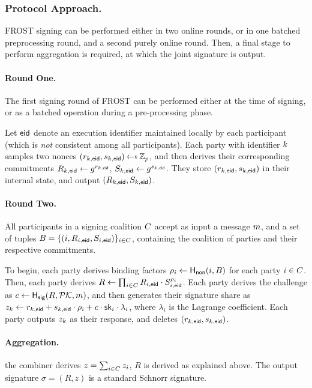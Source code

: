 \subsubsection{Protocol Approach.}

FROST signing can be performed either in two online rounds,
or in one batched preprocessing round,
and a second purely online round.
Then, a final stage to perform aggregation is required,
at which the joint signature is output.

\paragraph{Round One.}
The first signing round of FROST can be performed either at the time of signing,
or as a batched operation during a pre-processing phase.

Let $\mathsf{eid}$ denote an execution identifier maintained locally by each participant
(which is \emph{not} consistent among all participants).
Each party with identifier $k$ samples two nonces $(r_{\partyid,\eid},  s_{\partyid, \eid}) \randpick \Zp$,
and then derives their corresponding commitments  $R_{k,\mathsf{eid}} \gets g^{r_{k, \mathsf{eid}}}$, $ S_{k,\mathsf{eid}} \gets  g^{s_{k,\mathsf{eid}}}$.
They store $(r_{k,\mathsf{eid}}, s_{k,\mathsf{eid}})$ in their internal state,
and output $(R_{k,\mathsf{eid}}, S_{k,\mathsf{eid}})$.

\paragraph{Round Two.}
All participants in a signing coalition $C$ accept as input a message $m$,
and a set of tuples $B = \{ (i, R_{i,\mathsf{eid}}, S_{i,\mathsf{eid}})\}_{i \in C}$,
containing the coalition of parties and their respective commitments.

To begin,
each party derives binding factors $\rho_i \gets \mathsf{H_{non}}(i, B)$ for each party $i \in C$.
Then, each party derives $R \gets \prod_{i \in C} R_{i,\mathsf{eid}} \cdot  S_{i,\mathsf{eid}}^{\rho_i}$.
Each party derives the challenge as $c \gets \mathsf{H_{sig}}(R, \mathcal{PK}, m)$,
and then generates their signature share as
$z_k \gets r_{k,\mathsf{eid}} + s_{k,\mathsf{eid}} \cdot \rho_i + c \cdot \mathsf{sk}_i \cdot \lambda_i$,
where $\lambda_i$ is the Lagrange coefficient.
Each party outputs $z_k$ as their response,
and deletes $(r_{k,\mathsf{eid}}, s_{k,\mathsf{eid}})$.


\paragraph{Aggregation.}
the combiner derives $z = \sum_{i \in C} z_i$,
$R$ is derived as explained above.
The output signature $\sigma = (R,z)$ is a standard Schnorr signature.

